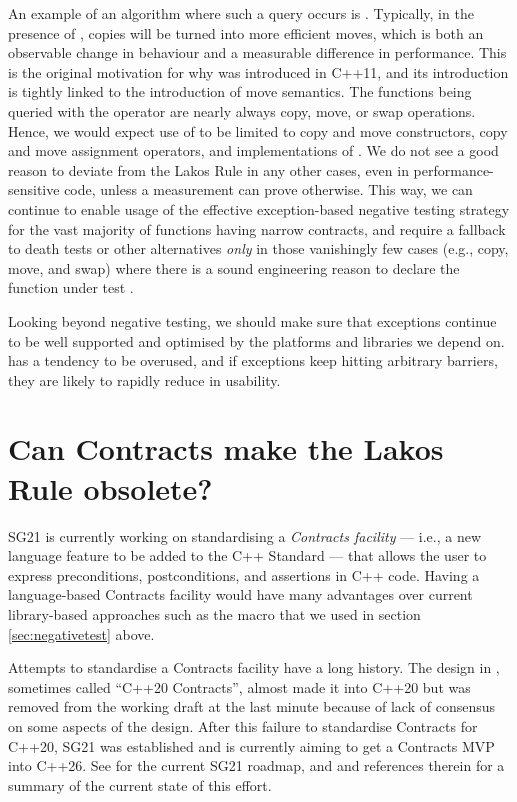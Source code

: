 An example of an algorithm where such a query occurs is . Typically, in the presence of , copies will be turned into more efficient moves, which is both an observable change in behaviour and a measurable difference in performance. This is the original motivation for why  was introduced in C++11, and its introduction is tightly linked to the introduction of move semantics. The functions being queried with the  operator are nearly always copy, move, or swap operations. Hence, we would expect use of  to be limited to copy and move constructors, copy and move assignment operators, and implementations of . We do not see a good reason to deviate from the Lakos Rule in any other cases, even in performance-sensitive code, unless a measurement can prove otherwise. This way, we can continue to enable usage of the effective exception-based negative testing strategy for the vast majority of functions having narrow contracts, and require a fallback to death tests or other alternatives \emph{only} in those vanishingly few cases (e.g., copy, move, and swap) where there is a sound engineering reason to declare the function under test .

Looking beyond negative testing, we should make sure that exceptions continue to be well supported and optimised by the platforms and libraries we depend on.  has a tendency to be overused, and if exceptions keep hitting arbitrary  barriers, they are likely to rapidly reduce in usability. 

\section{Can Contracts make the Lakos Rule obsolete?}
\label{sec:contracts}

SG21 is currently working on standardising a \emph{Contracts facility} --- i.e., a new language feature to be added to the C++ Standard --- that allows the user to express preconditions, postconditions, and assertions in C++ code. Having a language-based Contracts facility would have many advantages over current library-based approaches such as the  macro that we used in section \ref{sec:negativetest} above.

Attempts to standardise a Contracts facility have a long history. The design in \cite{P0542R5}, sometimes called ``C++20 Contracts'', almost made it into C++20 but was removed from the working draft at the last minute because of lack of consensus on some aspects of the design. After this failure to standardise Contracts for C++20, SG21 was established and is currently aiming to get a Contracts MVP into C++26. See \cite{P2695R1} for the current SG21 roadmap, and \cite{P2521R3} and references therein for a summary of the current state of this effort.

